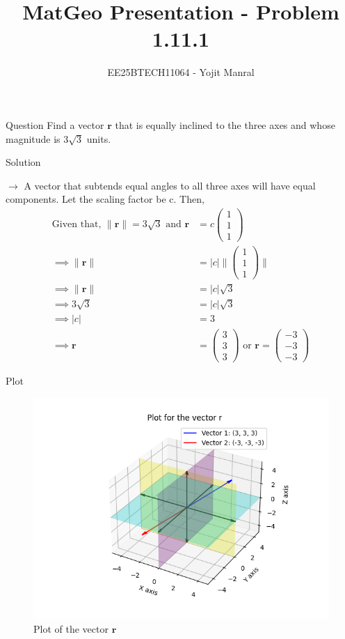 \documentclass{beamer}
\title{MatGeo Presentation - Problem 1.11.1}
\author{EE25BTECH11064 - Yojit Manral}
\date{}
\numberwithin{equation}{section}
\theoremstyle{remark}
\providecommand{\abs}[1]{\left\vert#1\right\vert}
\providecommand{\norm}[1]{\lVert#1\rVert}
\newcommand{\myvec}[1]{\ensuremath{\begin{pmatrix}#1\end{pmatrix}}}
\let\vec\mathbf
\begin{document}
\frame{\titlepage}
\begin{frame}{Question}
Find a vector $\vec{r}$ that is equally inclined to the three axes and whose magnitude is $3\sqrt{3}$ units.
\end{frame}

\begin{frame}{Solution}

$\rightarrow$ A vector that subtends equal angles to all three axes will have equal components. Let the scaling factor be c. Then,\\

\begin{align}
	\text{Given that, } \norm{\vec{r}} = 3\sqrt{3} \text{ and } \vec{r} &= c\myvec{1\\1\\1} \\
	\implies \norm{\vec{r}} &= \abs{c}\norm{\myvec{1\\1\\1}} \\
	\implies \norm{\vec{r}} &= \abs{c}\sqrt{3} \\
	\implies 3\sqrt{3} &= \abs{c}\sqrt{3}\\
	\implies \abs{c} &= 3\\
    \implies \vec{r}&=\myvec{3\\3\\3} \text{ or } \vec{r}=\myvec{-3\\-3\\-3}
\end{align}

\end{frame}

\begin{frame}{Plot}
\begin{figure}[h!]
   \centering
   \includegraphics[width=0.8\linewidth]{figs/01.png}
   \caption{Plot of the vector $\vec{r}$}
   \label{Plot_1}
\end{figure}
\end{frame}
\end{document}
